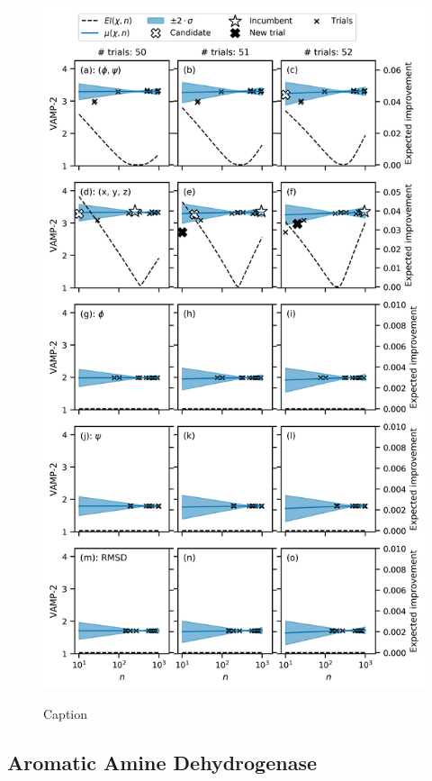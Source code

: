 \begin{figure}
    \centering
    \caption{Caption}
    \includegraphics[height=0.8\textheight]{chapters/msm_optimization/figures/ala1_opt_explainer.png}
    \label{fig:ala1_opt_expl}
\end{figure}




\subsection{Aromatic Amine Dehydrogenase}

